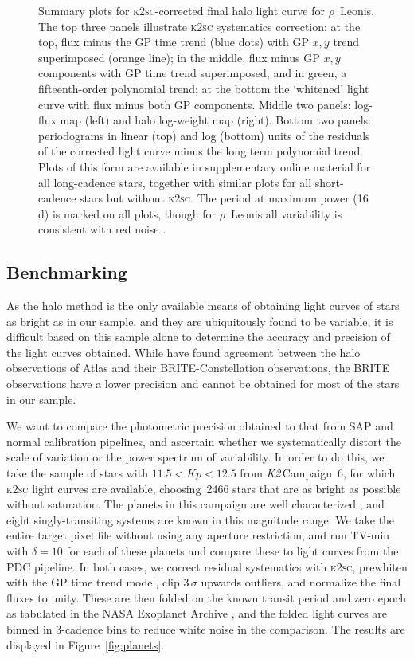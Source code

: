 \documentclass[modern]{aastex62}
\newcommand\ktwo{\emph{K2}\,}
\begin{document}
\begin{figure*}
\caption{Summary plots for \textsc{k2sc}-corrected final halo light curve for $\rho$~Leonis. The top three panels illustrate \textsc{k2sc} systematics correction: at the top, flux minus the GP time trend (blue dots) with GP $x,y$ trend superimposed (orange line); in the middle, flux minus GP $x,y$ components with GP time trend superimposed, and in green, a fifteenth-order polynomial trend; at the bottom the `whitened' light curve with flux minus both GP components. Middle two panels: log-flux map (left) and halo log-weight map (right). Bottom two panels: periodograms in linear (top) and log (bottom) units of the residuals of the corrected light curve minus the long term polynomial trend. Plots of this form are available in supplementary online material for all long-cadence stars, together with similar plots for all short-cadence stars but without \textsc{k2sc}. The period at maximum power (16\,d) is marked on all plots, though for $\rho$~Leonis all variability is consistent with red noise \citep{bowman19}.}
\label{fig:rholeo}
\end{figure*}

\subsection{Benchmarking}
\label{sec:benchmarking}

As the halo method is the only available means of obtaining light curves of stars as bright as in our sample, and they are ubiquitously found to be variable, it is difficult based on this sample alone to determine the accuracy and precision of the light curves obtained. While \citet{Kallinger2018} have found agreement between the \citet{White2017} halo observations of Atlas and their BRITE-Constellation observations, the BRITE observations have a lower precision and cannot be obtained for most of the stars in our sample. 

We want to compare the photometric precision obtained to that from SAP and normal calibration pipelines, and ascertain whether we systematically distort the scale of variation or the power spectrum of variability. In order to do this, we take the sample of stars with $11.5 <  Kp < 12.5$ from \ktwo Campaign~6, for which \textsc{k2sc} light curves are available, choosing~2466 stars that are as bright as possible without saturation. The planets in this campaign are well characterized \citep[e.g.][]{Pope2016planets}, and eight singly-transiting systems are known in this magnitude range. We take the entire target pixel file without using any aperture restriction, and run TV-min with $\delta = 10$ for each of these planets and compare these to light curves from the PDC pipeline. In both cases, we correct residual systematics with \textsc{k2sc}, prewhiten with the GP time trend model, clip $3\,\sigma$ upwards outliers, and normalize the final fluxes to unity. These are then folded on the known transit period and zero epoch as tabulated in the NASA Exoplanet Archive \citep{2013PASP..125..989A}, and the folded light curves are binned in 3-cadence bins to reduce white noise in the comparison. The results are displayed in Figure~\ref{fig:planets}.
\end{document}
